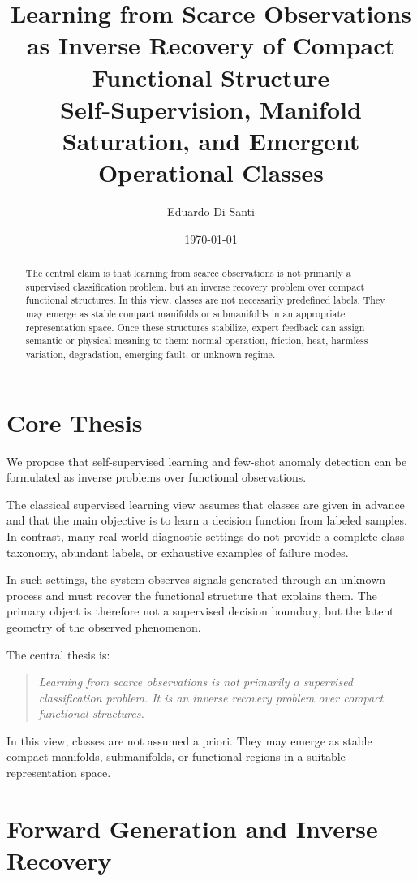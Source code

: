 \documentclass[11pt,a4paper]{article}
\title{\textbf{Learning from Scarce Observations as Inverse Recovery of Compact Functional Structure}\\
\large Self-Supervision, Manifold Saturation, and Emergent Operational Classes}
\author{Eduardo Di Santi}
\affil{College of Engineering and Applied Science \\ 
\normalsize \texttt{eduardo.disanti@colorado.edu}}
\date{\today}
\begin{document}
\maketitle

\begin{abstract}

The central claim is that learning from scarce observations is not primarily a supervised classification problem, but an inverse recovery problem over compact functional structures. In this view, classes are not necessarily predefined labels. They may emerge as stable compact manifolds or submanifolds in an appropriate representation space. Once these structures stabilize, expert feedback can assign semantic or physical meaning to them: normal operation, friction, heat, harmless variation, degradation, emerging fault, or unknown regime.
\end{abstract}

\section{Core Thesis}

We propose that self-supervised learning and few-shot anomaly detection can be formulated as inverse problems over functional observations.

The classical supervised learning view assumes that classes are given in advance and that the main objective is to learn a decision function from labeled samples. In contrast, many real-world diagnostic settings do not provide a complete class taxonomy, abundant labels, or exhaustive examples of failure modes.

In such settings, the system observes signals generated through an unknown process and must recover the functional structure that explains them. The primary object is therefore not a supervised decision boundary, but the latent geometry of the observed phenomenon.

The central thesis is:

\begin{quote}
\emph{Learning from scarce observations is not primarily a supervised classification problem. It is an inverse recovery problem over compact functional structures.}
\end{quote}

In this view, classes are not assumed a priori. They may emerge as stable compact manifolds, submanifolds, or functional regions in a suitable representation space.

\section{Forward Generation and Inverse Recovery}
\end{document}
